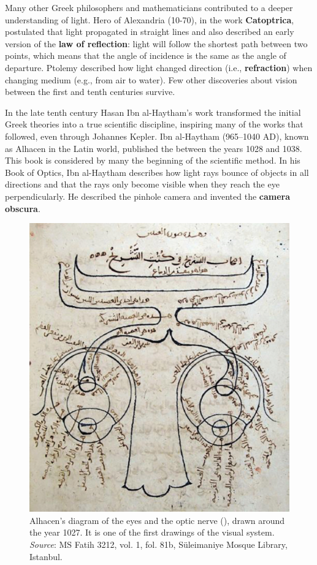 Many other Greek philosophers and mathematicians
contributed to a deeper understanding of light. Hero of Alexandria (10-70), in the work \textbf{Catoptrica}, postulated that light propagated in straight lines and also described an early version of the {\bf law of reflection}: light will follow the shortest path between two points, which means that the angle of incidence is the same as the angle of departure. Ptolemy described how light changed direction (i.e., {\bf refraction}) when changing medium (e.g., from air to water). Few other discoveries about vision between the first and tenth centuries survive.



In the late tenth century Hasan Ibn al-Haytham's work transformed the initial Greek theories into a true scientific discipline, inspiring many of the works that followed, even through Johannes Kepler.  Ibn al-Haytham (965--1040 AD), known as Alhacen in the Latin world, published the  \cite{2001alhacen} between the years 1028 and 1038. This book is considered by many the beginning of the scientific method. In his Book of Optics, Ibn al-Haytham describes how light rays bounce of objects in all directions and that the rays only become visible when they reach the eye perpendicularly. He described the pinhole camera and invented the {\bf camera obscura}.


\begin{figure}[t]
    \centerline{
        \includegraphics[width=0.5\linewidth]{figures/taxonomy/Alhazen1652.png}
    }
    \caption{Alhacen's diagram of the eyes and the optic nerve (), drawn around the year 1027. It is one of the first drawings of the visual system. {\em Source}: MS Fatih 3212, vol. 1, fol. 81b, Süleimaniye Mosque Library, Istanbul.}
    \label{fig:Alhacen}
\end{figure}


